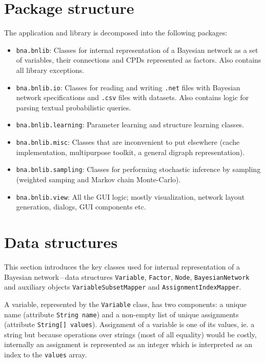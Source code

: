 \documentclass[english,cover]{fitthesis} %
\newcommand{\srccode}[1]{{\tt #1}}         %
\begin{document}
\section{Package structure}
The application and library is decomposed into the following packages:
\begin{itemize}
    \item \srccode{bna.bnlib}: Classes for internal representation of a Bayesian network as a set of variables, their connections and CPDs represented as factors. Also contains all library exceptions.
    \item \srccode{bna.bnlib.io}: Classes for reading and writing \srccode{.net} files with Bayesian network specifications and \srccode{.csv} files with datasets. Also contains logic for parsing textual probabilistic queries. 
    \item \srccode{bna.bnlib.learning}: Parameter learning and structure learning classes.
    \item \srccode{bna.bnlib.misc}: Classes that are inconvenient to put elsewhere (cache implementation, multipurpose toolkit, a general digraph representation).
    \item \srccode{bna.bnlib.sampling}: Classes for performing stochastic inference by sampling (weighted samping and Markov chain Monte-Carlo).
    \item \srccode{bna.bnlib.view}: All the GUI logic; mostly visualization, network layout generation, dialogs, GUI components etc.
\end{itemize}




\section{Data structures}\label{ch:implementation-data_structures}
This section introduces the key classes used for internal representation of a Bayesian network\,--\,data structures \srccode{Variable}, \srccode{Factor}, \srccode{Node}, \srccode{BayesianNetwork} and auxiliary objects \srccode{VariableSubsetMapper} and \srccode{AssignmentIndexMapper}.

A variable, represented by the \srccode{Variable} class, has two components: a unique name (attribute \srccode{String name}) and a non-empty list of unique assignments (attribute \srccode{String[] values}). Assignment of a variable is one of its values, ie. a string but because operations over strings (most of all equality) would be costly, internally an assignment is represented as an integer which is interpreted as an index to the \srccode{values} array.
\end{document}
